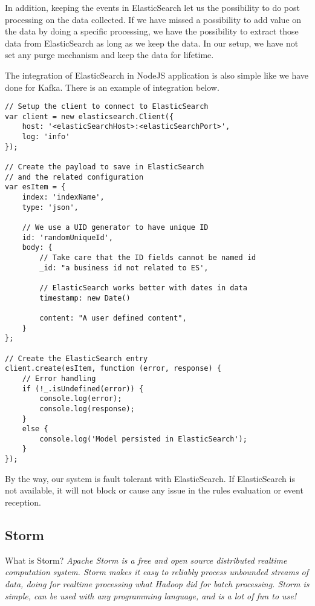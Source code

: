 In addition, keeping the events in ElasticSearch let us the possibility to do post processing on the data collected. If we have missed a possibility to add value on the data by doing a specific processing, we have the possibility to extract those data from ElasticSearch as long as we keep the data. In our setup, we have not set any purge mechanism and keep the data for lifetime.

The integration of ElasticSearch in NodeJS application is also simple like we have done for Kafka. There is an example of integration below.

\begin{lstlisting}
// Setup the client to connect to ElasticSearch
var client = new elasticsearch.Client({
	host: '<elasticSearchHost>:<elasticSearchPort>',
	log: 'info'
});

// Create the payload to save in ElasticSearch 
// and the related configuration
var esItem = {
	index: 'indexName',
	type: 'json',

	// We use a UID generator to have unique ID
	id: 'randomUniqueId', 
	body: {
		// Take care that the ID fields cannot be named id
		_id: "a business id not related to ES', 

		// ElasticSearch works better with dates in data
		timestamp: new Date() 

		content: "A user defined content",
	}
};

// Create the ElasticSearch entry
client.create(esItem, function (error, response) {
	// Error handling
	if (!_.isUndefined(error)) {
		console.log(error);
		console.log(response);
	}
	else {
		console.log('Model persisted in ElasticSearch');
	}
});
\end{lstlisting}

By the way, our system is fault tolerant with ElasticSearch. If ElasticSearch is not available, it will not block or cause any issue in the rules evaluation or event reception. 

\subsection{Storm}

What is Storm? \emph{Apache Storm is a free and open source distributed realtime computation system. Storm makes it easy to reliably process unbounded streams of data, doing for realtime processing what Hadoop did for batch processing. Storm is simple, can be used with any programming language, and is a lot of fun to use!}

